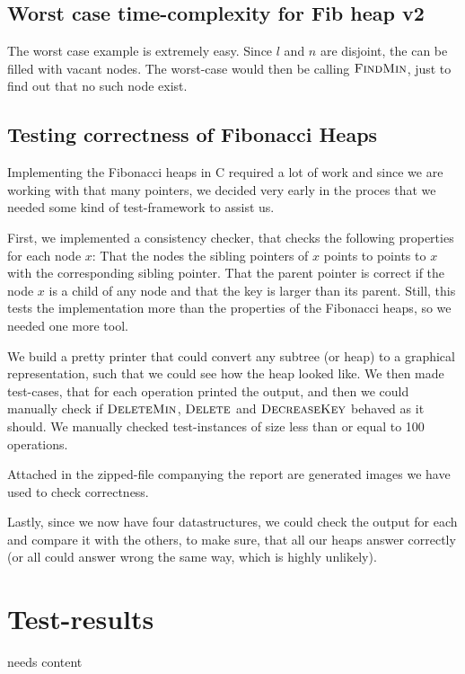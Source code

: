\documentclass[oneside,11pt,openright]{report}
\newcommand{\FindMin}{\textsc{FindMin}}
\newcommand{\DeleteMin}{\textsc{DeleteMin}}
\newcommand{\DecreaseKey}{\textsc{DecreaseKey}}
\newcommand{\Delete}{\textsc{Delete}}
\begin{document}
\section{Worst case time-complexity for Fib heap v2}

The worst case example is extremely easy. Since $l$ and $n$ are disjoint, the can be filled with vacant nodes. The worst-case would then be calling $\FindMin$, just to find out that no such node exist. 

\section{Testing correctness of Fibonacci Heaps}

Implementing the Fibonacci heaps in C required a lot of work and since we are working with that many pointers, we decided very early in the proces that we needed some kind of test-framework to assist us. 

First, we implemented a consistency checker, that checks the following properties for each node $x$: That the nodes the sibling pointers of $x$ points to points to $x$ with the corresponding sibling pointer. That the parent pointer is correct if the node $x$ is a child of any node and that the key is larger than its parent. Still, this tests the implementation more than the properties of the Fibonacci heaps, so we needed one more tool.

We build a pretty printer that could convert any subtree (or heap) to a graphical representation, such that we could see how the heap looked like. We then made test-cases, that for each operation printed the output, and then we could manually check if $\DeleteMin$, $\Delete$ and $\DecreaseKey$ behaved as it should. We manually checked test-instances of size less than or equal to 100 operations.

Attached in the zipped-file companying the report are generated images we have used to check correctness.

Lastly, since we now have four datastructures, we could check the output for each and compare it with the others, to make sure, that all our heaps answer correctly (or all could answer wrong the same way, which is highly unlikely).

\chapter{Test-results}

needs content
\end{document}
